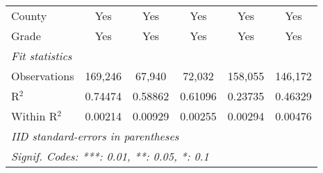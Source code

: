 \begin{table}[htbp]
\begin{tabular}{lccccc}
      County               & Yes                    & Yes             & Yes            & Yes             & Yes\\
      Grade                & Yes                    & Yes             & Yes            & Yes             & Yes\\
      \midrule \emph{Fit statistics} &   &   &   &   &  \\
      Observations         & 169,246                & 67,940          & 72,032         & 158,055         & 146,172\\
      R$^2$                & 0.74474                & 0.58862         & 0.61096        & 0.23735         & 0.46329\\
      Within R$^2$         & 0.00214                & 0.00929         & 0.00255        & 0.00294         & 0.00476\\
      \midrule\midrule\multicolumn{6}{l}{\emph{IID standard-errors in parentheses}}\\
      \multicolumn{6}{l}{\emph{Signif. Codes: ***: 0.01, **: 0.05, *: 0.1}}\\
   \end{tabular}
\end{table}


